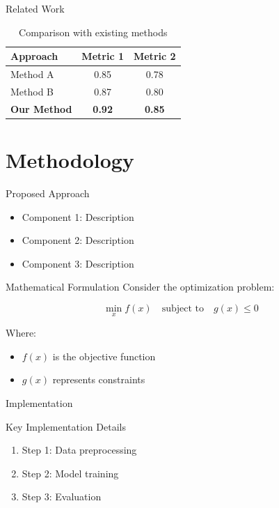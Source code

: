 \documentclass[aspectratio=169]{beamer}
\begin{document}
\begin{frame}{Related Work}
\begin{table}
\centering
\begin{tabular}{lcc}
\toprule
Approach & Metric 1 & Metric 2 \\
\midrule
Method A & 0.85 & 0.78 \\
Method B & 0.87 & 0.80 \\
\textbf{Our Method} & \textbf{0.92} & \textbf{0.85} \\
\bottomrule
\end{tabular}
\caption{Comparison with existing methods}
\end{table}
\end{frame}

\section{Methodology}

\begin{frame}{Proposed Approach}
\begin{itemize}
    \item Component 1: Description
    \item Component 2: Description
    \item Component 3: Description
\end{itemize}

\begin{center}
\end{center}
\end{frame}

\begin{frame}{Mathematical Formulation}
Consider the optimization problem:

\begin{equation}
\min_{x} f(x) \quad \text{subject to} \quad g(x) \leq 0
\end{equation}

Where:
\begin{itemize}
    \item $f(x)$ is the objective function
    \item $g(x)$ represents constraints
\end{itemize}
\end{frame}

\begin{frame}{Implementation}
\begin{block}{Key Implementation Details}
\begin{enumerate}
    \item Step 1: Data preprocessing
    \item Step 2: Model training
    \item Step 3: Evaluation
\end{enumerate}
\end{block}
\end{frame}
\end{document}
